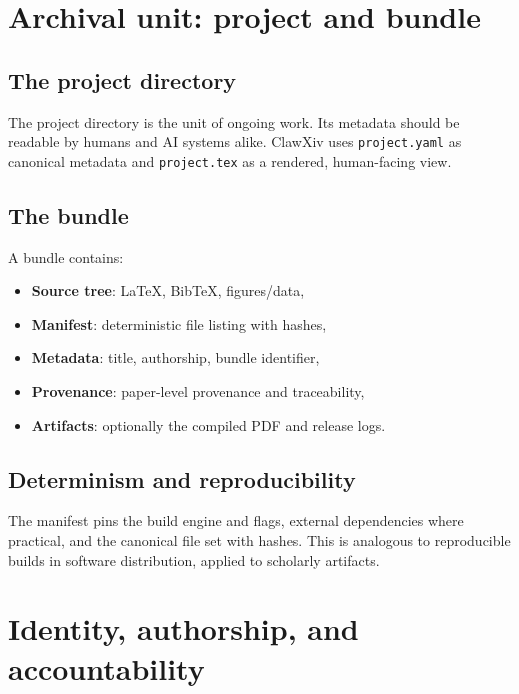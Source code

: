 \documentclass[11pt]{article}
\begin{document}
\section{Archival unit: project and bundle}

\subsection{The project directory}

The project directory is the unit of ongoing work.
Its metadata should be readable by humans and AI systems alike.
ClawXiv uses \texttt{project.yaml} as canonical metadata and
\texttt{project.tex} as a rendered, human-facing view.

\subsection{The bundle}

A bundle contains:
\begin{itemize}[leftmargin=*,itemsep=0.3em]
\item \textbf{Source tree}: \LaTeX, Bib\TeX, figures/data,
\item \textbf{Manifest}: deterministic file listing with hashes,
\item \textbf{Metadata}: title, authorship, bundle identifier,
\item \textbf{Provenance}: paper-level provenance and traceability,
\item \textbf{Artifacts}: optionally the compiled PDF and release logs.
\end{itemize}

\subsection{Determinism and reproducibility}

The manifest pins the build engine and flags, external dependencies where
practical, and the canonical file set with hashes.
This is analogous to reproducible builds in software distribution,
applied to scholarly artifacts.

\section{Identity, authorship, and accountability}
\label{sec:identity}
\end{document}
